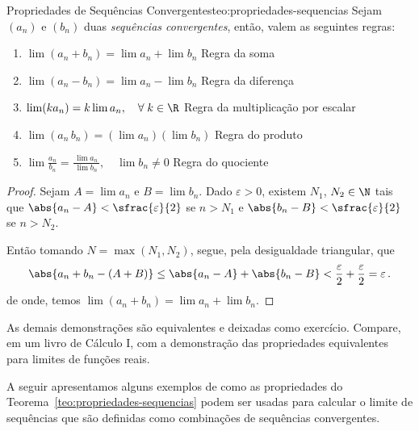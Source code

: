 \begin{teorema}{Propriedades de Sequências Convergentes}{teo:propriedades-sequencias}
  Sejam $(a_n)$ e $(b_n)$ duas \emph{sequências convergentes},
  então, valem as seguintes regras:
  \begin{enumerate}
    \item \(\lim (a_n+b_n) = \lim a_n + \lim b_n\)                                       \tabto{78mm}Regra da soma
    \item \(\lim (a_n-b_n) = \lim a_n - \lim b_n\)                                       \tabto{78mm}Regra da diferença
    \item \(\lim (k a_n)   = k\lim a_n,\quad \forall\; k\in\R\)                          \tabto{78mm}Regra da multiplicação por escalar
    \item \(\lim (a_n\,b_n)= (\lim a_n)(\lim b_n)\)                                      \tabto{78mm}Regra do produto
    \item \(\lim \frac{a_n}{b_n} = \frac{\,\lim a_n\,}{\lim b_n},\quad \lim b_n \neq 0\) \tabto{78mm}Regra do quociente
  \end{enumerate}
\end{teorema}
\begin{proof}
  Sejam $A=\lim a_n$ e $B=\lim b_n$.
  Dado $\varepsilon>0$, existem $N_1$, $N_2\in\N$
  tais que \( \abs{a_n-A} < \sfrac{\varepsilon}{2} \) se $n>N_1$
  e        \( \abs{b_n-B} < \sfrac{\varepsilon}{2} \) se $n>N_2$.

  Então tomando $N=\max(N_1, N_2)$, segue, pela desigualdade triangular, que
  \[
    \abs{a_n+b_n-(A+B)}
    \leq \abs{a_n-A} + \abs{b_n-B}
    < \frac{\varepsilon}{2} + \frac{\varepsilon}{2}
    = \varepsilon \,.
  \]
  de onde, temos $\lim (a_n+b_n)=\lim a_n+\lim b_n$.
\end{proof}

As demais demonstrações são equivalentes e deixadas como exercício.
Compare, em um livro de Cálculo I, com a demonstração das propriedades
equivalentes para limites de funções reais.

A seguir apresentamos alguns exemplos de como as propriedades do
Teorema~\ref{teo:propriedades-sequencias} podem ser usadas para calcular
o limite de sequências que são definidas como combinações
de sequências convergentes.

